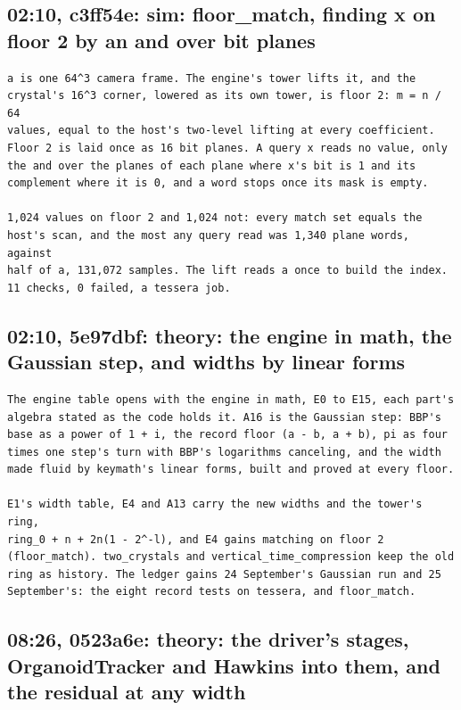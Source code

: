 \subsection{\texorpdfstring{02:10, c3ff54e: sim: floor\_\allowbreak{}match, finding x on floor 2 by an and over bit planes}{02:10, c3ff54e: sim: floor\_match, finding x on floor 2 by an and over bit planes}}

\begin{Verbatim}
a is one 64^3 camera frame. The engine's tower lifts it, and the
crystal's 16^3 corner, lowered as its own tower, is floor 2: m = n / 64
values, equal to the host's two-level lifting at every coefficient.
Floor 2 is laid once as 16 bit planes. A query x reads no value, only
the and over the planes of each plane where x's bit is 1 and its
complement where it is 0, and a word stops once its mask is empty.

1,024 values on floor 2 and 1,024 not: every match set equals the
host's scan, and the most any query read was 1,340 plane words, against
half of a, 131,072 samples. The lift reads a once to build the index.
11 checks, 0 failed, a tessera job.
\end{Verbatim}

\subsection{\texorpdfstring{02:10, 5e97dbf: theory: the engine in math, the Gaussian step, and widths by linear forms}{02:10, 5e97dbf: theory: the engine in math, the Gaussian step, and widths by linear forms}}

\begin{Verbatim}
The engine table opens with the engine in math, E0 to E15, each part's
algebra stated as the code holds it. A16 is the Gaussian step: BBP's
base as a power of 1 + i, the record floor (a - b, a + b), pi as four
times one step's turn with BBP's logarithms canceling, and the width
made fluid by keymath's linear forms, built and proved at every floor.

E1's width table, E4 and A13 carry the new widths and the tower's ring,
ring_0 + n + 2n(1 - 2^-l), and E4 gains matching on floor 2
(floor_match). two_crystals and vertical_time_compression keep the old
ring as history. The ledger gains 24 September's Gaussian run and 25
September's: the eight record tests on tessera, and floor_match.
\end{Verbatim}

\subsection{\texorpdfstring{08:26, 0523a6e: theory: the driver's stages, OrganoidTracker and Hawkins into them, and the residual at any width}{08:26, 0523a6e: theory: the driver's stages, OrganoidTracker and Hawkins into them, and the residual at any width}}

